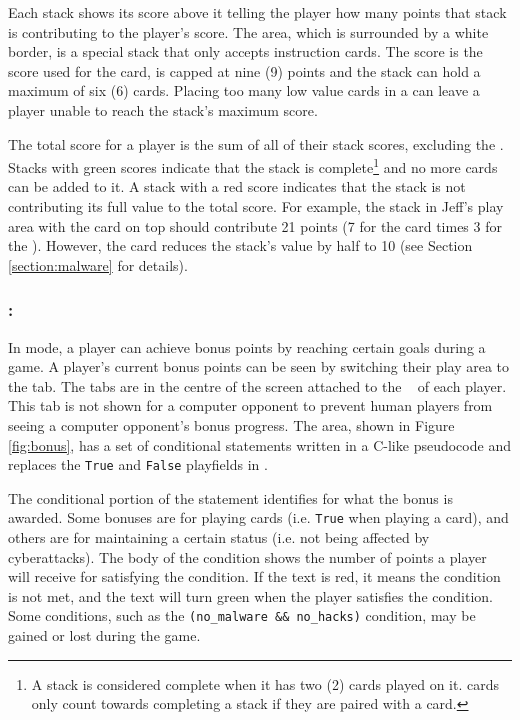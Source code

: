 Each stack shows its score above it telling the player how many points that stack is contributing to the player's score. The \MS area, which is surrounded by a white border, is a special stack that only accepts instruction cards. The \MS score is the score used for the \M card, is capped at nine (9) points and the stack can hold a maximum of six (6) \I cards. Placing too many low value \I cards in a \MS can leave a player unable to reach the stack's maximum score.

The total score for a player is the sum of all of their stack scores, excluding the \MSns. Stacks with green scores indicate that the stack is complete\footnote{A stack is considered complete when it has two (2) \R cards played on it. \Rx cards only count towards completing a stack if they are paired with a \V card.} and no more cards can be added to it. A stack with a red score indicates that the stack is not contributing its full value to the total score. For example, the stack in Jeff's play area with the \Vi card on top should contribute 21 points (7 for the \M card times 3 for the ). However, the \Vi card reduces the stack's value by half to 10 (see Section \ref{section:malware} for details). 

\subsubsection{\Goals:}
In \Std mode, a player can achieve bonus points by reaching certain goals during a game. A player's current bonus points can be seen by switching their play area to the \Bns tab. The tabs are in the centre of the screen attached to the \Prg~ of each player. This tab is not shown for a computer opponent to prevent human players from seeing a computer opponent's bonus progress. The \Bns area, shown in Figure \ref{fig:bonus}, has a set of conditional statements written in a C-like pseudocode and replaces the \texttt{True} and \texttt{False} playfields in \pwOne.

The conditional portion of the statement identifies for what the bonus is awarded. Some bonuses are for playing cards (i.e. \texttt{True} when playing a \R card), and others are for maintaining a certain status (i.e. not being affected by cyberattacks). The body of the condition shows the number of points a player will receive for satisfying the condition. If the text is red, it means the condition is not met, and the text will turn green when the player satisfies the condition. Some conditions, such as the \texttt{(no\_malware \&\& no\_hacks)} condition, may be gained or lost during the game.

